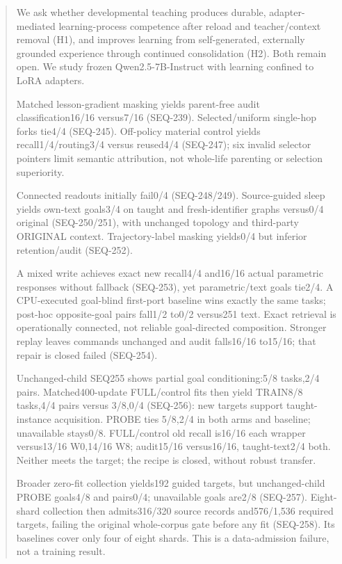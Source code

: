 \documentclass{article}
\begin{document}
\begin{abstract}
We ask whether developmental teaching produces durable, adapter-mediated
learning-process competence after reload and teacher/context removal (H1), and
improves learning from self-generated, externally grounded experience through
continued consolidation (H2). Both remain open. We study frozen
Qwen2.5-7B-Instruct with learning confined to LoRA adapters.

Matched lesson-gradient masking yields parent-free audit classification16/16
versus7/16 (SEQ-239). Selected/uniform single-hop forks tie4/4 (SEQ-245).
Off-policy material control yields recall1/4/routing3/4 versus reused4/4
(SEQ-247); six invalid selector pointers limit semantic attribution, not
whole-life parenting or selection superiority.

Connected readouts initially fail0/4 (SEQ-248/249). Source-guided sleep yields
own-text goals3/4 on taught and fresh-identifier graphs versus0/4 original
(SEQ-250/251), with unchanged topology and third-party ORIGINAL context.
Trajectory-label masking yields0/4 but inferior retention/audit (SEQ-252).

A mixed write achieves exact new recall4/4 and16/16 actual parametric responses
without fallback (SEQ-253), yet parametric/text goals tie2/4. A CPU-executed
goal-blind first-port baseline wins exactly the same tasks; post-hoc opposite-goal
pairs fall1/2 to0/2 versus251 text. Exact retrieval is operationally connected,
not reliable goal-directed composition. Stronger replay leaves commands unchanged
and audit falls16/16 to15/16; that repair is closed failed (SEQ-254).

Unchanged-child SEQ255 shows partial goal conditioning:5/8 tasks,2/4 pairs.
Matched400-update FULL/control fits then yield TRAIN8/8 tasks,4/4 pairs versus
3/8,0/4 (SEQ-256): new targets support taught-instance acquisition. PROBE ties
5/8,2/4 in both arms and baseline; unavailable stays0/8. FULL/control old recall
is16/16 each wrapper versus13/16 W0,14/16 W8; audit15/16 versus16/16, taught-text2/4
both. Neither meets the target; the recipe is closed, without robust transfer.

Broader zero-fit collection yields192 guided targets, but unchanged-child PROBE
goals4/8 and pairs0/4; unavailable goals are2/8 (SEQ-257). Eight-shard collection
then admits316/320 source records and576/1,536 required targets, failing the
original whole-corpus gate before any fit (SEQ-258). Its baselines cover only
four of eight shards. This is a data-admission failure, not a training result.


\end{abstract}
\end{document}
